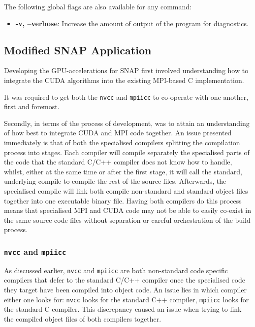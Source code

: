 \documentclass[conference]{IEEEtran}
\begin{document}
The following global flags are also available for any command:

\begin{itemize}
    \item \textbf{-v, --verbose}: Increase the amount of output of the program for diagnostics.
\end{itemize}


\subsection{Modified SNAP Application}
\label{subsec:imp_mod_snap}

Developing the GPU-accelerations for SNAP first involved understanding how to integrate the CUDA algorithms into the existing MPI-based C implementation.

It was required to get both the \texttt{nvcc} and \texttt{mpiicc} to co-operate with one another, first and foremost.

Secondly, in terms of the process of development, was to attain an understanding of how best to integrate CUDA and MPI code together. An issue presented immediately is that of both the specialised compilers splitting the compilation process into stages. Each compiler will compile separately the specialised parts of the code that the standard C/C++ compiler does not know how to handle, whilst, either at the same time or after the first stage, it will call the standard, underlying compile to compile the rest of the source files. Afterwards, the specialised compile will link both compile non-standard and standard object files together into one executable binary file. Having both compilers do this process means that specialised MPI and CUDA code may not be able to easily co-exist in the same source code files without separation or careful orchestration of the build process.

\subsubsection{\texttt{nvcc} and \texttt{mpiicc}}

As discussed earlier, \texttt{nvcc} and \texttt{mpiicc} are both non-standard code specific compilers that defer to the standard C/C++ compiler once the specialised code they target have been compiled into object code. An issue lies in which compiler either one looks for: \texttt{nvcc} looks for the standard C++ compiler, \texttt{mpiicc} looks for the standard C compiler. This discrepancy caused an issue when trying to link the compiled object files of both compilers together.
\end{document}
